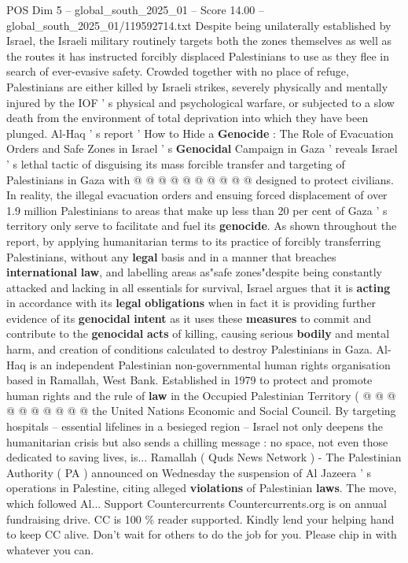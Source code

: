 \begin{textsample}{POS Dim 5 – global\_south\_2025\_01 – Score 14.00 – global\_south\_2025\_01/119592714.txt}
Despite being unilaterally established by Israel, the Israeli military routinely targets both the zones themselves as well as the routes it has instructed forcibly displaced Palestinians to use as they flee in search of ever-evasive safety.
Crowded together with no place of refuge, Palestinians are either killed by Israeli strikes, severely physically and mentally injured by the IOF ' s physical and psychological warfare, or subjected to a slow death from the environment of total deprivation into which they have been plunged.
Al-Haq ' s report ' How to Hide a \textbf{Genocide} : The Role of Evacuation Orders and Safe Zones in Israel ' s \textbf{Genocidal} Campaign in Gaza ' reveals Israel ' s lethal tactic of disguising its mass forcible transfer and targeting of Palestinians in Gaza with @ @ @ @ @ @ @ @ @ @ designed to protect civilians.
In reality, the illegal evacuation orders and ensuing forced displacement of over 1.9 million Palestinians to areas that make up less than 20 per cent of Gaza ' s territory only serve to facilitate and fuel its \textbf{genocide}.
As shown throughout the report, by applying humanitarian terms to its practice of forcibly transferring Palestinians, without any \textbf{legal} basis and in a manner that breaches \textbf{international} \textbf{law}, and labelling areas as"safe zones"despite being constantly attacked and lacking in all essentials for survival, Israel argues that it is \textbf{acting} in accordance with its \textbf{legal} \textbf{obligations} when in fact it is providing further evidence of its \textbf{genocidal} \textbf{intent} as it uses these \textbf{measures} to commit and contribute to the \textbf{genocidal} \textbf{acts} of killing, causing serious \textbf{bodily} and mental harm, and creation of conditions calculated to destroy Palestinians in Gaza.
Al-Haq is an independent Palestinian non-governmental human rights organisation based in Ramallah, West Bank.
Established in 1979 to protect and promote human rights and the rule of \textbf{law} in the Occupied Palestinian Territory ( @ @ @ @ @ @ @ @ @ @ the United Nations Economic and Social Council.
By targeting hospitals -- essential lifelines in a besieged region -- Israel not only deepens the humanitarian crisis but also sends a chilling message : no space, not even those dedicated to saving lives, is...
Ramallah ( Quds News Network ) - The Palestinian Authority ( PA ) announced on Wednesday the suspension of Al Jazeera ' s operations in Palestine, citing alleged \textbf{violations} of Palestinian \textbf{laws}.
The move, which followed Al...
Support Countercurrents Countercurrents.org is on annual fundraising drive.
CC is 100 \% reader supported.
Kindly lend your helping hand to keep CC alive.
Don't wait for others to do the job for you.
Please chip in with whatever you can.

\end{textsample}

